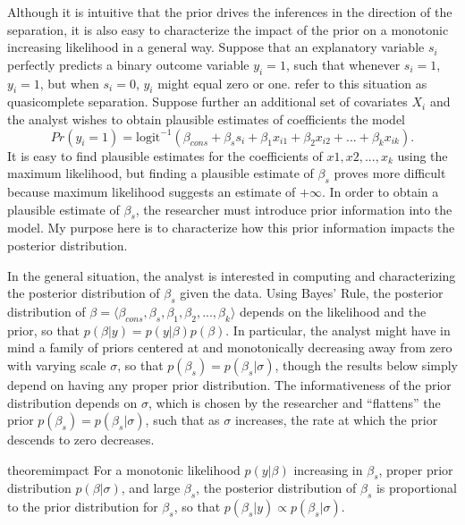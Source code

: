 \documentclass[12pt]{article}
\begin{document}
Although it is intuitive that the prior drives the inferences in the direction of the separation, it is also easy to characterize the impact of the prior on a monotonic increasing likelihood in a general way. Suppose that an explanatory variable $s_i$ perfectly predicts a binary outcome variable $y_i = 1$, such that whenever $s_i = 1$, $y_i = 1$, but when $s_i = 0$, $y_i$ might equal zero or one. \cite{AlbertAnderson1984} refer to this situation as quasicomplete separation. Suppose further an additional set of covariates $X_i$ and the analyst wishes to obtain plausible estimates of coefficients the model
\begin{equation*}
Pr(y_i =1) = \text{logit}^{-1}(\beta_{cons} + \beta_s s_i +  \beta_1 x_{i1} + \beta_2 x_{i2} + ... + \beta_k x_{ik}). 
\end{equation*}
\noindent It is easy to find plausible estimates for the coefficients of $x1, x2, ..., x_k$ using the maximum likelihood, but finding a plausible estimate of $\beta_{s}$ proves more difficult because maximum likelihood suggests an estimate of $+\infty$. In order to obtain a plausible estimate of $\beta_{s}$, the researcher must introduce prior information into the model. My purpose here is to characterize how this prior information impacts the posterior distribution.

In the general situation, the analyst is interested in computing and characterizing the posterior distribution of $\beta_s$ given the data. Using Bayes' Rule, the posterior distribution of $\beta = \langle \beta_{cons}, \beta_{s}, \beta_1, \beta_2, ..., \beta_k \rangle$ depends on the likelihood and the prior, so that $p(\beta | y) = p(y|\beta)p(\beta)$. In particular, the analyst might have in mind a family of priors centered at and monotonically decreasing away from zero with varying scale $\sigma$, so that $p(\beta_s) = p(\beta_s | \sigma)$, though the results below simply depend on having any proper prior distribution. The informativeness of the prior distribution depends on $\sigma$, which is chosen by the researcher and ``flattens'' the prior $p(\beta_s) = p(\beta_s | \sigma)$, such that as $\sigma$ increases, the rate at which the prior descends to zero decreases.

\begin{restatable}{theorem}{impact}\label{thm:impact}
For a monotonic likelihood $p(y | \beta)$ increasing in $\beta_s$, proper prior distribution $p(\beta | \sigma)$, and large $\beta_s$, the posterior distribution of $\beta_s$ is proportional to the prior distribution for $\beta_s$, so that $p(\beta_s | y) \propto p(\beta_s | \sigma)$.
\end{restatable}
\end{document}
